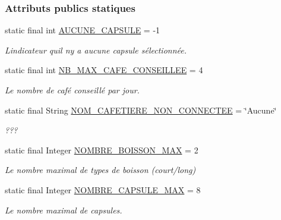 \subsubsection*{Attributs publics statiques}
\begin{DoxyCompactItemize}
\item 
static final int \hyperlink{classcom_1_1example_1_1ekawa_1_1_cafetiere_a5a23a636fa5f2e5826458e700f453c16}{A\+U\+C\+U\+N\+E\+\_\+\+C\+A\+P\+S\+U\+LE} = -\/1
\begin{DoxyCompactList}\small\item\em L\textquotesingle{}indicateur qu\textquotesingle{}il n\textquotesingle{}y a aucune capsule sélectionnée. \end{DoxyCompactList}\item 
static final int \hyperlink{classcom_1_1example_1_1ekawa_1_1_cafetiere_a9e0cce07580820dfbc85696f1fb82aef}{N\+B\+\_\+\+M\+A\+X\+\_\+\+C\+A\+F\+E\+\_\+\+C\+O\+N\+S\+E\+I\+L\+L\+EE} = 4
\begin{DoxyCompactList}\small\item\em Le nombre de café conseillé par jour. \end{DoxyCompactList}\item 
static final String \hyperlink{classcom_1_1example_1_1ekawa_1_1_cafetiere_a5b10663105c7e3fd28dfd9d51b5e925f}{N\+O\+M\+\_\+\+C\+A\+F\+E\+T\+I\+E\+R\+E\+\_\+\+N\+O\+N\+\_\+\+C\+O\+N\+N\+E\+C\+T\+EE} = \char`\"{}Aucune\char`\"{}
\begin{DoxyCompactList}\small\item\em ??? \end{DoxyCompactList}\item 
static final Integer \hyperlink{classcom_1_1example_1_1ekawa_1_1_cafetiere_a2be5950bf3bb155b8396593d390b808b}{N\+O\+M\+B\+R\+E\+\_\+\+B\+O\+I\+S\+S\+O\+N\+\_\+\+M\+AX} = 2
\begin{DoxyCompactList}\small\item\em Le nombre maximal de types de boisson (court/long) \end{DoxyCompactList}\item 
static final Integer \hyperlink{classcom_1_1example_1_1ekawa_1_1_cafetiere_a183d96e89c056c4ac9c565bf8f24851e}{N\+O\+M\+B\+R\+E\+\_\+\+C\+A\+P\+S\+U\+L\+E\+\_\+\+M\+AX} = 8
\begin{DoxyCompactList}\small\item\em Le nombre maximal de capsules. \end{DoxyCompactList}\end{DoxyCompactItemize}
